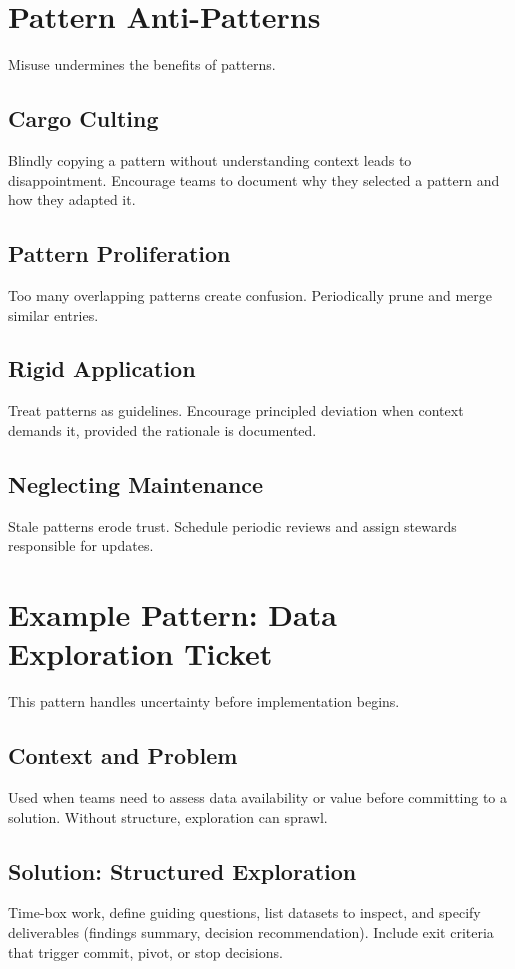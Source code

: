 \section{Pattern Anti-Patterns}
\label{sec:pattern-antipatterns}

Misuse undermines the benefits of patterns.

\subsection{Cargo Culting}
Blindly copying a pattern without understanding context leads to disappointment. Encourage teams to document why they selected a pattern and how they adapted it.

\subsection{Pattern Proliferation}
Too many overlapping patterns create confusion. Periodically prune and merge similar entries.

\subsection{Rigid Application}
Treat patterns as guidelines. Encourage principled deviation when context demands it, provided the rationale is documented.

\subsection{Neglecting Maintenance}
Stale patterns erode trust. Schedule periodic reviews and assign stewards responsible for updates.

\section{Example Pattern: Data Exploration Ticket}
\label{sec:example-exploration}

This pattern handles uncertainty before implementation begins.

\subsection{Context and Problem}
Used when teams need to assess data availability or value before committing to a solution. Without structure, exploration can sprawl.

\subsection{Solution: Structured Exploration}
Time-box work, define guiding questions, list datasets to inspect, and specify deliverables (findings summary, decision recommendation). Include exit criteria that trigger commit, pivot, or stop decisions.

